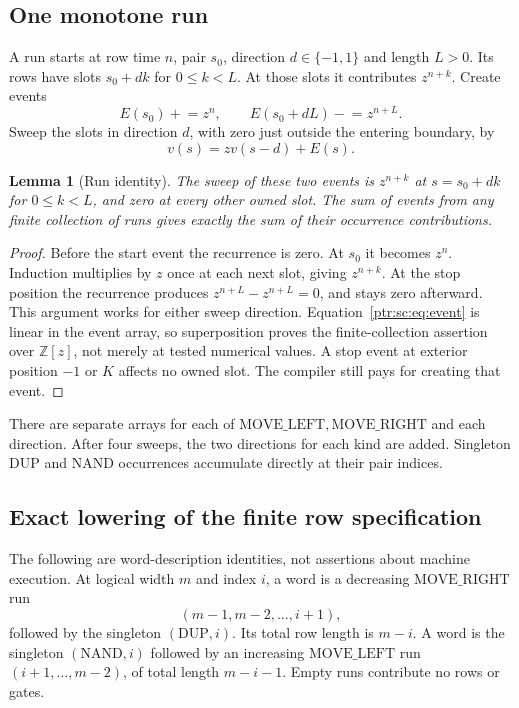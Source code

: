 \documentclass[11pt,letterpaper]{article}
\newtheorem{lemma}[theorem]{Lemma}
\theoremstyle{definition}\newtheorem{definition}[theorem]{Definition}
\theoremstyle{remark}\newtheorem{remark}[theorem]{Remark}
\newcommand{\Z}{\mathbb Z}\newcommand{\N}{\mathbb N}\newcommand{\Zp}{\mathbb Z_{>0}}
\newcommand{\op}[1]{\mathrm{#1}}
\newcommand{\codem}[1]{\mbox{\normalfont\ttfamily\detokenize{#1}}}
\newcommand{\sDUP}{\op{DUP}}\newcommand{\sNAND}{\op{NAND}}
\newcommand{\sML}{\op{MOVE\_LEFT}}\newcommand{\sMR}{\op{MOVE\_RIGHT}}
\begin{document}
\subsection{One monotone run}
A run starts at row time $n$, pair $s_0$, direction $d\in\{-1,1\}$ and length $L>0$. Its rows have slots $s_0+dk$ for $0\le k<L$. At those slots it contributes $z^{n+k}$. Create events
\[
 E(s_0)\mathrel{+}=z^n,\qquad E(s_0+dL)\mathrel{-}=z^{n+L}.
\]
Sweep the slots in direction $d$, with zero just outside the entering boundary, by
\begin{equation}\label{ptr:sc:eq:event}
 v(s)=zv(s-d)+E(s).
\end{equation}
\begin{lemma}[Run identity]\label{ptr:sc:lem:event}
The sweep of these two events is $z^{n+k}$ at $s=s_0+dk$ for $0\le k<L$, and zero at every other owned slot. The sum of events from any finite collection of runs gives exactly the sum of their occurrence contributions.
\end{lemma}
\begin{proof}
Before the start event the recurrence is zero. At $s_0$ it becomes $z^n$. Induction multiplies by $z$ once at each next slot, giving $z^{n+k}$. At the stop position the recurrence produces $z^{n+L}-z^{n+L}=0$, and stays zero afterward. This argument works for either sweep direction. Equation~\eqref{ptr:sc:eq:event} is linear in the event array, so superposition proves the finite-collection assertion over $\Z[z]$, not merely at tested numerical values. A stop event at exterior position $-1$ or $K$ affects no owned slot. The compiler still pays for creating that event.
\end{proof}
There are separate arrays for each of $\sML,\sMR$ and each direction. After four sweeps, the two directions for each kind are added. Singleton $\sDUP$ and $\sNAND$ occurrences accumulate directly at their pair indices.

\subsection{Exact lowering of the finite row specification}
The following are word-description identities, not assertions about machine execution. At logical width $m$ and index $i$, a \codem{DUP} word is a decreasing $\sMR$ run
\[
 (m-1,m-2,\ldots,i+1),
\]
followed by the singleton $(\sDUP,i)$. Its total row length is $m-i$. A \codem{NAND} word is the singleton $(\sNAND,i)$ followed by an increasing $\sML$ run $(i+1,\ldots,m-2)$, of total length $m-i-1$. Empty runs contribute no rows or gates.
\end{document}
